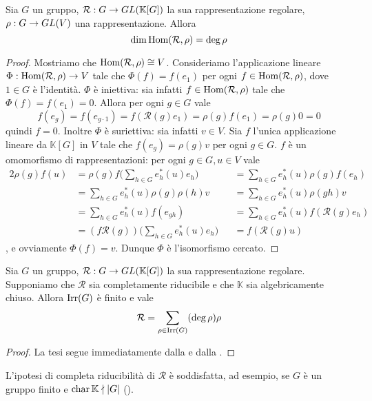 \begin{proposition}
Sia $G$ un gruppo, $\mathcal{R}:G\to GL(\mathbb{K}[G])$ la sua rappresentazione regolare, $\rho:G\to GL(V)$ una rappresentazione. Allora 
$$
\dim\operatorname{Hom}(\mathcal{R},\rho)=\deg\rho
$$
\end{proposition}
\begin{proof}
Mostriamo che $\operatorname{Hom}(\mathcal{R},\rho)\cong V$. Consideriamo l'applicazione lineare
$\Phi:\operatorname{Hom}(\mathcal{R},\rho)\to V$ tale che $\Phi(f)=f(e_1)$ per ogni $f\in\operatorname{Hom}(\mathcal{R},\rho)$, dove $1\in G$ è l'identità. $\Phi$ è iniettiva: sia infatti $f\in\operatorname{Hom}(\mathcal{R},\rho)$ tale che $\Phi(f)=f(e_1)=0$. Allora per ogni $g\in G$ vale
$$
f(e_g)=f(e_{g\cdot1})=f(\mathcal{R}(g)e_1)=\rho(g)f(e_1)=\rho(g)0=0
$$
quindi $f=0$. Inoltre $\Phi$ è suriettiva: sia infatti $v\in V$. Sia $f$ l'unica applicazione lineare da $\mathbb{K}[G]$ in $V$ tale che $f(e_g)=\rho(g)v$ per ogni $g\in G$. $f$ è un omomorfismo di rappresentazioni: per ogni $g\in G,u\in V$ vale
\begin{alignat*}{2}
\rho(g)f(u)&=\rho(g)f\biggl(\sum_{h\in G}e_h^*(u)e_h\biggr)
&&=\sum_{h\in G}e_h^*(u)\rho(g)f(e_h)\\
&=\sum_{h\in G}e_h^*(u)\rho(g)\rho(h)v
&&=\sum_{h\in G}e_h^*(u)\rho(gh)v\\
&=\sum_{h\in G}e_h^*(u)f(e_{gh})
&&=\sum_{h\in G}e_h^*(u)f(\mathcal{R}(g)e_h)\\
&=(f\mathcal{R}(g))\biggl(\sum_{h\in G}e_h^*(u)e_h\biggr)&&=f(\mathcal{R}(g)u)
\end{alignat*}
, e ovviamente $\Phi(f)=v$. Dunque $\Phi$ è l'isomorfismo cercato.
\end{proof}

\begin{corollary}
Sia $G$ un gruppo, $\mathcal{R}:G\to GL(\mathbb{K}[G])$ la sua rappresentazione regolare. Supponiamo che $\mathcal{R}$ sia completamente riducibile e che $\mathbb{K}$ sia algebricamente chiuso. Allora $\operatorname{Irr}(G)$ è finito e vale
$$
\mathcal{R}=\sum_{\rho\in\operatorname{Irr}(G)}(\deg\rho)\rho
$$
\end{corollary}
\begin{proof}
La tesi segue immediatamente dalla  e dalla .
\end{proof}

\begin{remark}
L'ipotesi di completa riducibilità di $\mathcal{R}$ è soddisfatta, ad esempio, se $G$ è un gruppo finito e $\operatorname{char}\mathbb{K}\nmid|G|$ ().
\end{remark}

